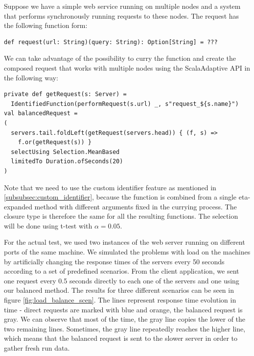Suppose we have a simple web service running on multiple nodes and a system that performs synchronously running requests to these nodes. The request has the following function form:

\lstset{style=Scala}
\begin{lstlisting}
def request(url: String)(query: String): Option[String] = ???
\end{lstlisting}

We can take advantage of the possibility to curry the function and create the composed request that works with multiple nodes using the ScalaAdaptive API in the following way:

\lstset{style=Scala}
\begin{lstlisting}
private def getRequest(s: Server) = 
  IdentifiedFunction(performRequest(s.url) _, s"request_${s.name}")
val balancedRequest =
(
  servers.tail.foldLeft(getRequest(servers.head)) { (f, s) =>
    f.or(getRequest(s)) }
  selectUsing Selection.MeanBased
  limitedTo Duration.ofSeconds(20)
)
\end{lstlisting}

Note that we need to use the custom identifier feature as mentioned in \ref{subsubsec:custom_identifier}, because the function is combined from a single eta-expanded method with different arguments fixed in the currying process. The closure type is therefore the same for all the resulting functions. The selection will be done using t-test with $\alpha = 0.05$.

For the actual test, we used two instances of the web server running on different ports of the same machine. We simulated the problems with load on the machines by artificially changing the response times of the servers every 50 seconds according to a set of predefined scenarios. From the client application, we sent one request every 0.5 seconds directly to each one of the servers and one using our balanced method. The results for three different scenarios can be seen in figure \ref{fig:load_balance_scen}. The lines represent response time evolution in time - direct requests are marked with blue and orange, the balanced request is gray. We can observe that most of the time, the gray line copies the lower of the two remaining lines. Sometimes, the gray line repeatedly reaches the higher line, which means that the balanced request is sent to the slower server in order to gather fresh run data.

